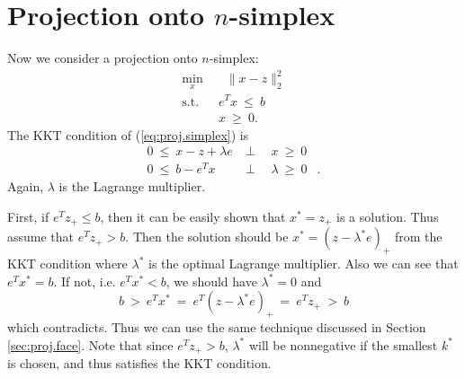 \documentclass{siamltex}
\newcommand*{\beq}{\begin{equation}}
\newcommand*{\eeq}{\end{equation}}
\newcommand*{\bseq}{\begin{subequations}}
\newcommand*{\eseq}{\end{subequations}}
\newcommand*{\eqnok}[1]{(\ref{#1})}
\DeclareMathOperator*{\st}{\text{s.t.}}
\DeclareMathOperator*{\half}{\frac{1}{2}}
\begin{document}
\section{Projection onto $n$-simplex}
Now we consider a projection onto $n$-simplex:
\bseq\begin{alignat}{2}\label{eq:proj.simplex}
 \min_{x} &~~ \half\|x-z\|_2^2 \\
 \st      &~~ e^T x ~\le~ b \label{eq:proj.simplex.ineq}\\
          &~~ x ~\ge~ 0.
\end{alignat}\eseq
The KKT condition of \eqnok{eq:proj.simplex} is
\bseq\begin{alignat}{2}
 0 ~\le~ x-z+\lambda e  & ~\perp~ &~ x ~\ge~ 0 \\
 0 ~\le~ b-e^T x & ~\perp~ &~ \lambda ~\ge~ 0&.
\end{alignat}\eseq
Again, $\lambda$ is the Lagrange multiplier.

First, if $e^Tz_+\le b$, then it can be easily shown that $x^* = z_+$ is a solution. Thus assume that $e^Tz_+>b$. Then the solution should be $x^*=(z-\lambda^* e)_+$ from the KKT condition where $\lambda^*$ is the optimal Lagrange multiplier. Also we can see that $e^Tx^*=b$. If not, i.e. $e^Tx^*<b$, we should have $\lambda^*=0$ and 
\beq
 b ~>~ e^Tx^* ~=~ e^T(z-\lambda^*e)_+ ~=~ e^Tz_+ ~>~b
\eeq
which contradicts. Thus we can use the same technique discussed in Section \ref{sec:proj.face}. Note that since $e^Tz_+>b$, $\lambda^*$ will be nonnegative if the smallest $k^*$ is chosen, and thus satisfies the KKT condition.
\end{document}
